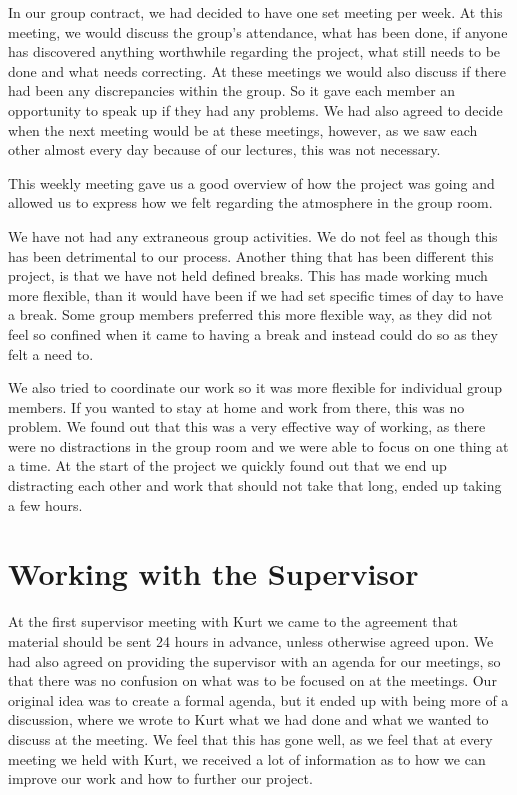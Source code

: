 \documentclass{article}
\begin{document}
In our group contract, we had decided to have one set meeting per week. At this meeting, we would discuss the group's attendance, what has been done, if anyone has discovered anything worthwhile regarding the project, what still needs to be done and what needs correcting. 
At these meetings we would also discuss if there had been any discrepancies within the group. So it gave each member an opportunity to speak up if they had any problems.
We had also agreed to decide when the next meeting would be at these meetings, however, as we saw each other almost every day because of our lectures, this was not necessary.

This weekly meeting gave us a good overview of how the project was going and allowed us to express how we felt regarding the atmosphere in the group room. 

We have not had any extraneous group activities. 
We do not feel as though this has been detrimental to our process.
Another thing that has been different this project, is that we have not held defined breaks. 
This has made working much more flexible, than it would have been if we had set specific times of day to have a break. 
Some group members preferred this more flexible way, as they did not feel so confined when it came to having a break and instead could do so as they felt a need to.

We also tried to coordinate our work so it was more flexible for individual group members. If you wanted to stay at home and work from there, this was no problem. We found out that this was a very effective way of working, as there were no distractions in the group room and we were able to focus on one thing at a time. At the start of the project we quickly found out that we end up distracting each other and work that should not take that long, ended up taking a few hours.

\section{Working with the Supervisor}
At the first supervisor meeting with Kurt we came to the agreement that material should be sent 24 hours in advance, unless otherwise agreed upon. 
We had also agreed on providing the supervisor with an agenda for our meetings, so that there was no confusion on what was to be focused on at the meetings. 
Our original idea was to create a formal agenda, but it ended up with being more of a discussion, where we wrote to Kurt what we had done and what we wanted to discuss at the meeting. 
We feel that this has gone well, as we feel that at every meeting we held with Kurt, we received a lot of information as to how we can improve our work and how to further our project.
\end{document}
